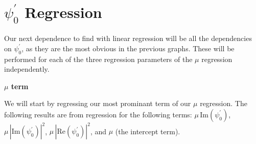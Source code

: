 \documentclass[11pt]{article}
\begin{document}
    \begin{center}
    \end{center}
    { \hspace*{\fill} \\}
    
    \hypertarget{psiprime_0-regression}{%
\section{\texorpdfstring{\(\psi^\prime_0\)
Regression}{\textbackslash psi\^{}\textbackslash prime\_0 Regression}}\label{psiprime_0-regression}}

    Our next dependence to find with linear regression will be all the
dependencies on \(\psi^\prime_0\), as they are the most obvious in the
previous graphs. These will be performed for each of the three
regression parameters of the \(\mu\) regression independently.

    \textbf{\(\mu\) term}

    We will start by regressing our most prominant term of our \(\mu\)
regression. The following results are from regression for the following
terms: \(\mu \, \mathrm{Im} (\psi^\prime_0)\),
\(\mu \, |\mathrm{Im} (\psi^\prime_0)|^2\),
\(\mu \,|\mathrm{Re} (\psi^\prime_0)|^2\), and \(\mu\) (the intercept
term).
\end{document}
